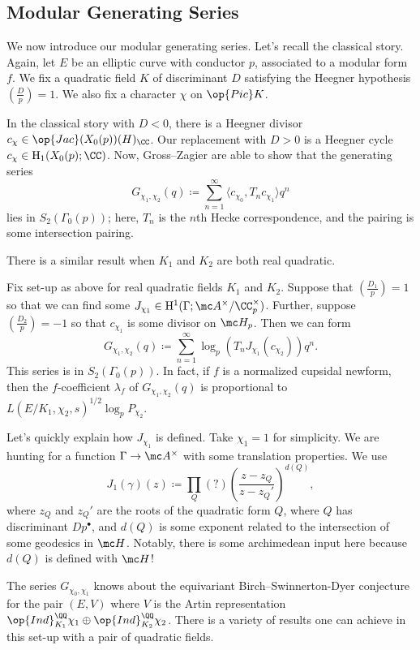 \documentclass{article}
\begin{document}
\subsection{Modular Generating Series}
We now introduce our modular generating series. Let's recall the classical story. Again, let $E$ be an elliptic curve with conductor $p$, associated to a modular form $f$. We fix a quadratic field $K$ of discriminant $D$ satisfying the Heegner hypothesis $\left(\frac Dp\right)=1$. We also fix a character $\chi$ on $\op{Pic}K$.

In the classical story with $D<0$, there is a Heegner divisor $c_\chi\in\op{Jac}(X_0(p))(H)_\CC$. Our replacement with $D>0$ is a Heegner cycle $c_\chi\in\mathrm H_1(X_0(p);\CC)$. Now, Gross--Zagier are able to show that the generating series
\[G_{\chi_1,\chi_2}(q)\coloneqq\sum_{n=1}^\infty\langle c_{\chi_0},T_nc_{\chi_1}\rangle q^n\]
lies in $S_2(\Gamma_0(p))$; here, $T_n$ is the $n$th Hecke correspondence, and the pairing is some intersection pairing.

There is a similar result when $K_1$ and $K_2$ are both real quadratic.
\begin{theorem}
	Fix set-up as above for real quadratic fields $K_1$ and $K_2$. Suppose that $\left(\frac{D_1}p\right)=1$ so that we can find some $J_{\chi_1}\in\mathrm H^1(\Gamma;\mc A^\times/\CC_p^\times)$. Further, suppose $\left(\frac{D_2}p\right)=-1$ so that $c_{\chi_1}$ is some divisor on $\mc H_p$. Then we can form
	\[G_{\chi_1,\chi_2}(q)\coloneqq\sum_{n=1}^\infty\log_p\left(T_nJ_{\chi_1}(c_{\chi_2})\right)q^n.\]
	This series is in $S_2(\Gamma_0(p))$. In fact, if $f$ is a normalized cupsidal newform, then the $f$-coefficient $\lambda_f$ of $G_{\chi_1,\chi_2}(q)$ is proportional to $L(E/K_1,\chi_2,s)^{1/2}\log_pP_{\chi_2}$.
\end{theorem}
\begin{remark}
	Let's quickly explain how $J_{\chi_1}$ is defined. Take $\chi_1=1$ for simplicity. We are hunting for a function $\Gamma\to\mc A^\times$ with some translation properties. We use
	\[J_1(\gamma)(z)\coloneqq\prod_Q(?)\left(\frac{z-z_Q}{z-z_Q'}\right)^{d(Q)},\]
	where $z_Q$ and $z_Q'$ are the roots of the quadratic form $Q$, where $Q$ has discriminant $Dp^\bullet$, and $d(Q)$ is some exponent related to the intersection of some geodesics in $\mc H$. Notably, there is some archimedean input here because $d(Q)$ is defined with $\mc H$!
\end{remark}
\begin{remark}
	The series $G_{\chi_0,\chi_1}$ knows about the equivariant Birch--Swinnerton-Dyer conjecture for the pair $(E,V)$ where $V$ is the Artin representation $\op{Ind}^\QQ_{K_1}\chi_1\oplus\op{Ind}^\QQ_{K_2}\chi_2$. There is a variety of results one can achieve in this set-up with a pair of quadratic fields.
\end{remark}
\end{document}
